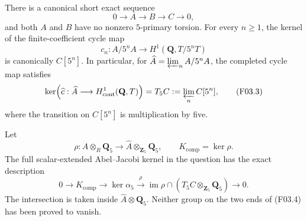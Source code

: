 \begin{theorem}[C44-F03]\label{C44-F03}
There is a canonical short exact sequence
\[
                 0\longrightarrow A\longrightarrow B
                   \longrightarrow C\longrightarrow0,
 \tag{F03.2}
\]
and both $A$ and $B$ have no nonzero $5$-primary torsion.
For every $n\ge1$, the kernel of the finite-coefficient cycle map
\[
 c_n:A/5^nA\longrightarrow H^1(\mathbf Q,T/5^nT)
\]
is canonically $C[5^n]$.  In particular, for
$\widehat A=\varprojlim_n A/5^nA$, the completed cycle map satisfies
\[
 \ker\!\left(\widehat c:\widehat A\longrightarrow
                    H^1_{\mathrm{cont}}(\mathbf Q,T)\right)
          = T_5C:=\varprojlim_n C[5^n],            \tag{F03.3}
\]
where the transition on $C[5^n]$ is multiplication by five.

Let
\[
 \rho:A\otimes_R\mathbf Q_5\longrightarrow
                  \widehat A\otimes_{\mathbf Z_5}\mathbf Q_5,
 \qquad K_{\mathrm{comp}}=\ker\rho.
\]
The full scalar-extended Abel--Jacobi kernel in the question has
the exact description
\[
 0\longrightarrow K_{\mathrm{comp}}
 \longrightarrow\ker\alpha_5
 \xrightarrow{\rho}
 \operatorname{im}\rho\cap
             (T_5C\otimes_{\mathbf Z_5}\mathbf Q_5)
 \longrightarrow0.                              \tag{F03.4}
\]
The intersection is taken inside
$\widehat A\otimes\mathbf Q_5$.  Neither group on the two ends
of (F03.4) has been proved to vanish.
\end{theorem}

